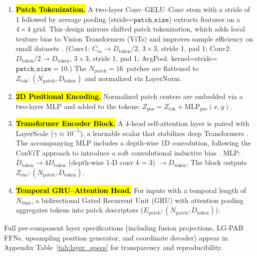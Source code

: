 \documentclass[remotesensing,article,accept,pdftex,moreauthors]{Definitions/mdpi}
\begin{document}
\begin{enumerate}[leftmargin=*]
\item \textbf{\hl{Patch Tokenization.}}
      A two-layer Conv–GELU–Conv stem with a stride of 1 %
      followed by average pooling (stride=$\texttt{patch\_size}$) extracts features on a $4\times4$ grid. This design mirrors shifted patch tokenization, which adds local texture bias to Vision Transformers (ViTs) and improves sample efficiency on small datasets \cite{lee2021vision}.
 (Conv1: $C_{in}\rightarrow D_{\text{token}}/2$, $3\times3$, stride 1, pad 1; Conv2: $D_{\text{token}}/2\rightarrow D_{\text{token}}$, $3\times3$, stride 1, pad 1; AvgPool: kernel=stride=$\texttt{patch\_size}=10$.) The \mbox{$N_{\text{patch}}=16$ patches} are flattened to $Z_{\text{tok}}: (N_{\text{patch}}, D_{\text{token}})$ and normalized via LayerNorm.


\item \textbf{\hl{2D Positional Encoding.}}
      Normalized patch centers are embedded via a two-layer MLP and added to the tokens: $Z_{\text{pos}} = Z_{\text{tok}} + \text{MLP}_{\text{pos}}(x,y)$.

\item \textbf{\hl{Transformer Encoder Block.}}
      A 4-head self-attention layer is paired with LayerScale ($\gamma \approx 10^{-5}$), a learnable scalar that stabilizes deep Transformers \cite{touvron2021going}. The accompanying MLP includes a depth-wise 1D convolution, following the ConViT approach to introduce a soft convolutional inductive bias \cite{dascoli2021convit}. MLP: $D_{\text{token}} \rightarrow 4 D_{\text{token}}$ (depth-wise 1-D conv $k=3$) $\rightarrow D_{\text{token}}$. The block outputs $Z_{\text{enc}}: (N_{\text{patch}}, D_{\text{token}})$.



\item \textbf{\hl{Temporal GRU–Attention Head.}}
      For inputs with a temporal length of $N_{\text{time}}$, a bidirectional Gated Recurrent Unit (GRU) with attention pooling aggregates tokens into patch descriptors ($E_{\text{patch}}: (N_{\text{patch}}, D_{\text{token}})$).
\end{enumerate}

Full per-component layer specifications (including fusion projections, LG-PAB FFNs, upsampling position generator, and coordinate decoder) appear in Appendix Table~\ref{tab:layer_specs} for transparency and reproducibility.

\vspace{-9pt}
\end{document}
